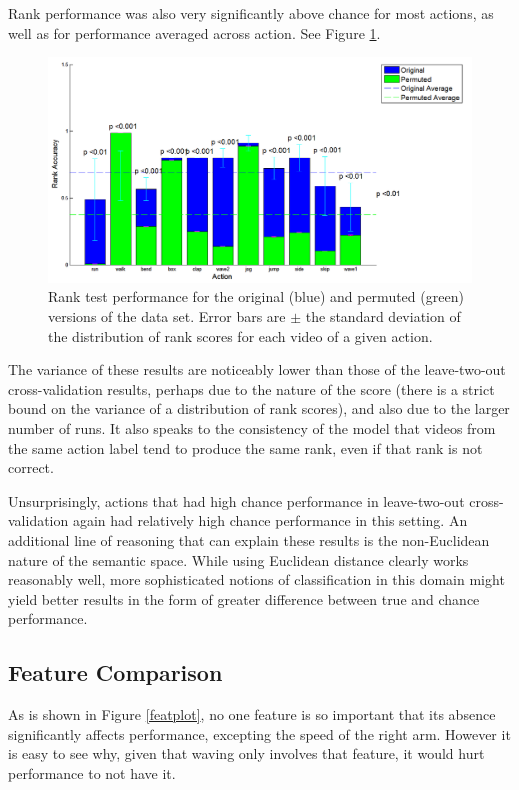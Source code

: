 \documentclass{article}
\begin{document}
Rank performance was also very significantly above chance for most actions, as well as for performance averaged across action. See Figure \ref{rankplot}.

\begin{figure}[h]
  \centering
  \includegraphics[width=.9\linewidth]{rank_snap_new}
  \caption{Rank test performance for the original (blue) and permuted (green) versions of the data set.  Error bars are $\pm$ the standard deviation of the distribution of rank scores for each video of a given action.}
  \label{rankplot}
\end{figure}

The variance of these results are noticeably lower than those of the leave-two-out cross-validation results, perhaps due to the nature of the score (there is a strict bound on the variance of a distribution of rank scores), and also due to the larger number of runs.  It also speaks to the consistency of the model that videos from the same action label tend to produce the same rank, even if that rank is not correct.

Unsurprisingly, actions that had high chance performance in leave-two-out cross-validation again had relatively high chance performance in this setting. An additional line of reasoning that can explain these results is the non-Euclidean nature of the semantic space. While using Euclidean distance clearly works reasonably well, more sophisticated notions of classification in this domain might yield better results in the form of greater difference between true and chance performance.

\subsection{Feature Comparison}

As is shown in Figure \ref{featplot}, no one feature is so important that its absence significantly affects performance, excepting the speed of the right arm.  However it is easy to see why, given that waving only involves that feature, it would hurt performance to not have it.
\end{document}
